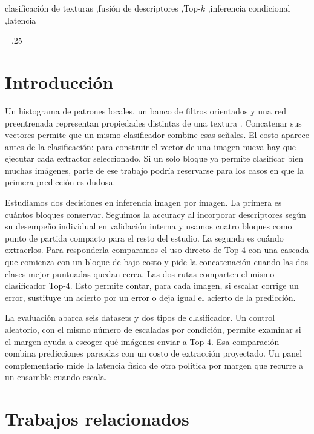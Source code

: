 \documentclass[a4paper,fleqn]{cas-sc}
\begin{document}
\begin{keywords}
clasificación de texturas \sep fusión de descriptores \sep Top-$k$ \sep inferencia condicional \sep latencia
\end{keywords}

\hfuzz=.25\textwidth
\maketitle
\hfuzz=0.1pt

\section{Introducción}

Un histograma de patrones locales, un banco de filtros orientados y una red preentrenada representan propiedades distintas de una textura \citep{ojala2002lbp,haralick1979glcm,cimpoi2014dtd,cimpoi2016fisher}. Concatenar sus vectores permite que un mismo clasificador combine esas señales. El costo aparece antes de la clasificación: para construir el vector de una imagen nueva hay que ejecutar cada extractor seleccionado. Si un solo bloque ya permite clasificar bien muchas imágenes, parte de ese trabajo podría reservarse para los casos en que la primera predicción es dudosa.

Estudiamos dos decisiones en inferencia imagen por imagen. La primera es cuántos bloques conservar. Seguimos la accuracy al incorporar descriptores según su desempeño individual en validación interna y usamos cuatro bloques como punto de partida compacto para el resto del estudio. La segunda es cuándo extraerlos. Para responderla comparamos el uso directo de Top-4 con una cascada que comienza con un bloque de bajo costo y pide la concatenación cuando las dos clases mejor puntuadas quedan cerca. Las dos rutas comparten el mismo clasificador Top-4. Esto permite contar, para cada imagen, si escalar corrige un error, sustituye un acierto por un error o deja igual el acierto de la predicción.

La evaluación abarca seis datasets y dos tipos de clasificador. Un control aleatorio, con el mismo número de escaladas por condición, permite examinar si el margen ayuda a escoger qué imágenes enviar a Top-4. Esa comparación combina predicciones pareadas con un costo de extracción proyectado. Un panel complementario mide la latencia física de otra política por margen que recurre a un ensamble cuando escala.

\section{Trabajos relacionados}
\end{document}

